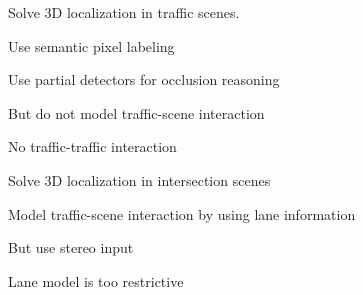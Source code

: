 
%
%
%
%
%
%

\begin{frame}{\cite{Wojek_etal_2013}}
  

  Solve 3D localization in traffic scenes.

  Use semantic pixel labeling

  Use partial detectors for occlusion reasoning

  \pause
  But do not model traffic-scene interaction

  No traffic-traffic interaction
    
\end{frame}

\begin{frame}{\cite{Geiger_etal_2012} }

  Solve 3D localization in intersection scenes

  Model traffic-scene interaction by using lane information

  \pause
  But use stereo input 
  
  Lane model is too restrictive

  \begin{center}
  \end{center}

    
\end{frame}

